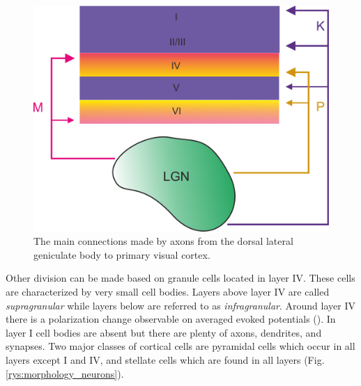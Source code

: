 \documentclass{pracalicmgr}
\begin{document}
    \begin{figure}[H]
	\begin{center}
		\includegraphics[scale=0.4]{aga_LGN.png}
	\end{center}
	\caption{The main connections made by axons from the dorsal lateral geniculate body to primary visual cortex.}
	\label{rys:lgn}
	\end{figure}  
\newpage
        Other division can be made based on granule cells located in layer IV. These cells are characterized by very small cell bodies. Layers above layer IV are called \emph{supragranular} while layers below are referred to as \emph{infragranular}. Around layer IV there is a polarization change observable on averaged evoked potentials (\cite{maier2010}). In layer I cell bodies are absent but there are plenty of axons, dendrites, and synapses. Two major classes of cortical cells are pyramidal cells which occur in all layers except I and IV, and stellate cells which are found in all layers (Fig. \ref{rys:morphology_neurons}).
        
\end{document}
